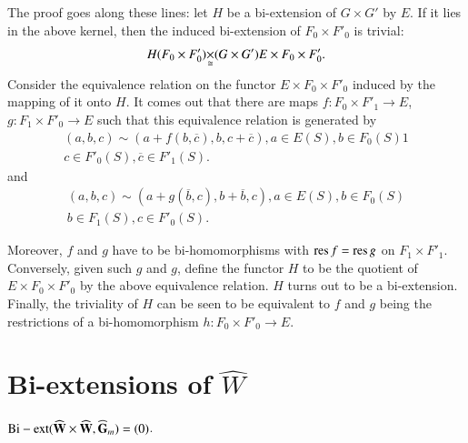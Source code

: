 The proof goes along these lines: let $H$ be a bi-extension of $G\times G'$ by $E$. If it lies in the above kernel, then the induced bi-extension of $F_{0}\times F'_{0}$ is trivial:
$$
H\fprod{(F_{0}\times F'_{0})}{(G\times G')}\cong E\times F_{0}\times F'_{0}.
$$
Consider the equivalence relation on the functor $E\times F_{0}\times F'_{0}$ induced by the mapping of it onto $H$. It comes out that there are maps $f:F_{0}\times F'_{1}\to E$, $g:F_{1}\times F'_{0}\to E$ such that this equivalence relation is generated by
\begin{multline}
(a,b,c)\sim (a+f(b,\overline{c}),b,c+\overline{c}),a\in E(S),b\in F_{0}(S)1\\
c\in F'_{0}(S),\overline{c}\in F'_{1}(S).\label{art15-eq1}
\end{multline}
and
\begin{multline}
(a,b,c)\sim (a+g(\overline{b},c),b+\overline{b},c), a\in E(S), b\in F_{0}(S)\\
b\in F_{1}(S), c\in F'_{0}(S).\label{art15-eq2}
\end{multline}

Moreover, $f$ and $g$ have to be bi-homomorphisms with $\operatorname{\mathrm{res}} f=\operatorname{\mathrm{res}} g$ on $F_{1}\times F'_{1}$. Conversely, given such $g$ and $g$, define the functor $H$ to be the quotient of $E\times F_{0}\times F'_{0}$ by the above equivalence relation. $H$ turns out to be a bi-extension. Finally, the triviality of $H$ can be seen to be equivalent to $f$ and $g$ being the restrictions of a bi-homomorphism $h:F_{0}\times F'_{0}\to E$.

\section{Bi-extensions of \texorpdfstring{$\widehat{W}$}{W}}\label{art15-sec4}

\begin{proposition}\label{art15-prop2}
${\rm Bi-ext } (\widehat{\mathbf{W}}\times \widehat{\mathbf{W}},\widehat{\mathbf{G}}_{m})=(0)$.
\end{proposition}

